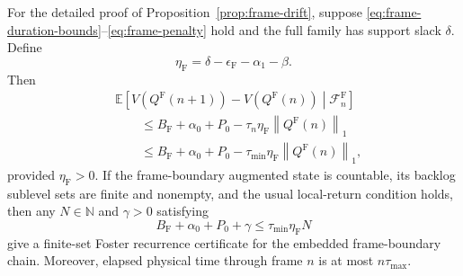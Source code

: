 \documentclass[opre,dblanonrev]{informs4}
\newcommand{\E}{\mathbb E}
\newcommand{\normone}[1]{\left\|#1\right\|_1}
\begin{document}
For the detailed proof of Proposition~\ref{prop:frame-drift}, suppose
\eqref{eq:frame-duration-bounds}--\eqref{eq:frame-penalty} hold and the full
family has support slack \(\delta\).  Define
\begin{equation}
  \eta_{\mathrm F}
  =
  \delta-\epsilon_{\mathrm F}-\alpha_1-\beta.
  \label{eq:frame-margin}
\end{equation}
Then
\begin{equation}
  \begin{aligned}
  &\E\!\left[
    V\!\left(Q^{\mathrm F}(n+1)\right)
    -V\!\left(Q^{\mathrm F}(n)\right)
    \middle|\mathcal F_n^{\mathrm F}
  \right]\\
  &\qquad\le
  B_{\mathrm F}+\alpha_0+P_0
  -\tau_n\eta_{\mathrm F}\normone{Q^{\mathrm F}(n)}\\
  &\qquad\le
  B_{\mathrm F}+\alpha_0+P_0
  -\tau_{\min}\eta_{\mathrm F}\normone{Q^{\mathrm F}(n)},
  \end{aligned}
  \label{eq:frame-drift}
\end{equation}
provided \(\eta_{\mathrm F}>0\).  If the frame-boundary augmented state is
countable, its backlog sublevel sets are finite and nonempty, and the usual
local-return condition holds, then any \(N\in\mathbb N\) and \(\gamma>0\)
satisfying
\begin{equation}
  B_{\mathrm F}+\alpha_0+P_0+\gamma
  \le \tau_{\min}\eta_{\mathrm F}N
  \label{eq:frame-foster-threshold}
\end{equation}
give a finite-set Foster recurrence certificate for the embedded
frame-boundary chain.  Moreover, elapsed physical time through frame \(n\) is
at most \(n\tau_{\max}\).
\end{document}
